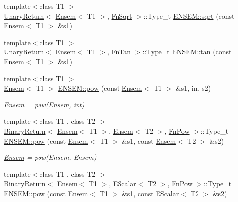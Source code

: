 \begin{DoxyCompactItemize}
\item 
{\footnotesize template$<$class T1 $>$ }\\\mbox{\hyperlink{structENSEM_1_1UnaryReturn}{Unary\+Return}}$<$ \mbox{\hyperlink{classENSEM_1_1Ensem}{Ensem}}$<$ T1 $>$, \mbox{\hyperlink{structENSEM_1_1FnSqrt}{Fn\+Sqrt}} $>$\+::Type\+\_\+t \mbox{\hyperlink{group__eensem_gac8bfa621e2dd6c732c311e9ffafb6eaf}{E\+N\+S\+E\+M\+::sqrt}} (const \mbox{\hyperlink{classENSEM_1_1Ensem}{Ensem}}$<$ T1 $>$ \&s1)
\item 
{\footnotesize template$<$class T1 $>$ }\\\mbox{\hyperlink{structENSEM_1_1UnaryReturn}{Unary\+Return}}$<$ \mbox{\hyperlink{classENSEM_1_1Ensem}{Ensem}}$<$ T1 $>$, \mbox{\hyperlink{structENSEM_1_1FnTan}{Fn\+Tan}} $>$\+::Type\+\_\+t \mbox{\hyperlink{group__eensem_ga56d3def0223da8c49dd2210228349eb0}{E\+N\+S\+E\+M\+::tan}} (const \mbox{\hyperlink{classENSEM_1_1Ensem}{Ensem}}$<$ T1 $>$ \&s1)
\item 
{\footnotesize template$<$class T1 $>$ }\\\mbox{\hyperlink{classENSEM_1_1Ensem}{Ensem}}$<$ T1 $>$ \mbox{\hyperlink{group__eensem_ga038873ee1f1a6dfb9540558711f11110}{E\+N\+S\+E\+M\+::pow}} (const \mbox{\hyperlink{classENSEM_1_1Ensem}{Ensem}}$<$ T1 $>$ \&s1, int s2)
\begin{DoxyCompactList}\small\item\em \mbox{\hyperlink{classENSEM_1_1Ensem}{Ensem}} = pow(\+Ensem, int) \end{DoxyCompactList}\item 
{\footnotesize template$<$class T1 , class T2 $>$ }\\\mbox{\hyperlink{structENSEM_1_1BinaryReturn}{Binary\+Return}}$<$ \mbox{\hyperlink{classENSEM_1_1Ensem}{Ensem}}$<$ T1 $>$, \mbox{\hyperlink{classENSEM_1_1Ensem}{Ensem}}$<$ T2 $>$, \mbox{\hyperlink{structENSEM_1_1FnPow}{Fn\+Pow}} $>$\+::Type\+\_\+t \mbox{\hyperlink{group__eensem_ga08a0a61df39df2d4038eed616fcfa56b}{E\+N\+S\+E\+M\+::pow}} (const \mbox{\hyperlink{classENSEM_1_1Ensem}{Ensem}}$<$ T1 $>$ \&s1, const \mbox{\hyperlink{classENSEM_1_1Ensem}{Ensem}}$<$ T2 $>$ \&s2)
\begin{DoxyCompactList}\small\item\em \mbox{\hyperlink{classENSEM_1_1Ensem}{Ensem}} = pow(\+Ensem, Ensem) \end{DoxyCompactList}\item 
{\footnotesize template$<$class T1 , class T2 $>$ }\\\mbox{\hyperlink{structENSEM_1_1BinaryReturn}{Binary\+Return}}$<$ \mbox{\hyperlink{classENSEM_1_1Ensem}{Ensem}}$<$ T1 $>$, \mbox{\hyperlink{classENSEM_1_1EScalar}{E\+Scalar}}$<$ T2 $>$, \mbox{\hyperlink{structENSEM_1_1FnPow}{Fn\+Pow}} $>$\+::Type\+\_\+t \mbox{\hyperlink{group__eensem_ga56e0a919e0060bdb32e0b2aa9ea97f11}{E\+N\+S\+E\+M\+::pow}} (const \mbox{\hyperlink{classENSEM_1_1Ensem}{Ensem}}$<$ T1 $>$ \&s1, const \mbox{\hyperlink{classENSEM_1_1EScalar}{E\+Scalar}}$<$ T2 $>$ \&s2)

\end{DoxyCompactItemize}
